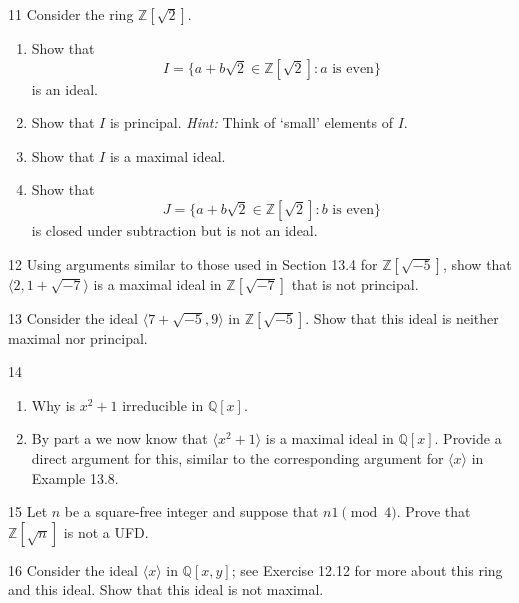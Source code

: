 \begin{problem}{11}
    Consider the ring $\mathbb{Z}[\sqrt{2}]$.
    \begin{enumerate}
        \item[(a)] Show that
        \[I = \{a + b\sqrt{2} \in \mathbb{Z}[\sqrt{2}] : a \text{ is even}\}\]
        is an ideal.
        \item[(b)] Show that $I$ is principal. \emph{Hint:} Think of `small' elements of $I$.
        \item[(c)] Show that $I$ is a maximal ideal.
        \item[(d)] Show that
        \[J = \{a + b\sqrt{2} \in \mathbb{Z}[\sqrt{2}] : b \text{ is even}\}\]
        is closed under subtraction but is not an ideal.
    \end{enumerate}
\end{problem}
\unsolved

\begin{problem}{12}
    Using arguments similar to those used in Section 13.4 for $\mathbb{Z}[\sqrt{-5}]$,
    show that $\langle 2, 1 + \sqrt{-7} \rangle$ is a maximal ideal in
    $\mathbb{Z}[\sqrt{-7}]$ that is not principal.
\end{problem}
\unsolved

\begin{problem}{13}
    Consider the ideal $\langle 7 + \sqrt{-5}, 9 \rangle$ in $\mathbb{Z}[\sqrt{-5}]$. Show
    that this ideal is neither maximal nor principal.
\end{problem}
\unsolved

\begin{problem}{14}
    \begin{enumerate}
        \item Why is $x^2 + 1$ irreducible in $\mathbb{Q}[x]$.
        \item By part a we now know that $\langle x^2 + 1 \rangle$ is a maximal ideal 
        in $\mathbb{Q}[x]$. Provide a direct argument for this, similar to the corresponding
        argument for $\langle x \rangle$ in Example 13.8.
    \end{enumerate}
\end{problem}
\unsolved

\begin{problem}{15}
    Let $n$ be a square-free integer and suppose that $n 1 \pmod{4}$.
    Prove that $\mathbb{Z}[\sqrt{n}]$ is not a UFD.
\end{problem}
\unsolved

\begin{problem}{16}
    Consider the ideal $\langle x \rangle$ in $\mathbb{Q}[x, y]$; see 
    Exercise 12.12 for more about this ring and this ideal.
    Show that this ideal is not maximal.
\end{problem}
\solved

